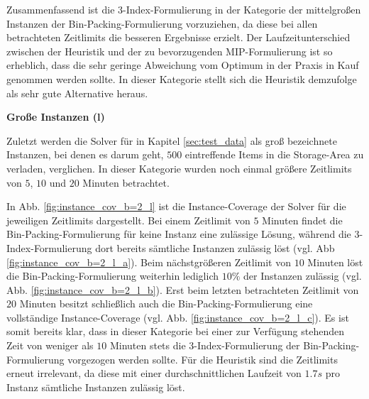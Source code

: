 Zusammenfassend ist die 3-Index-Formulierung in der Kategorie der mittelgroßen Instanzen der Bin-Packing-Formulierung vorzuziehen, da diese bei allen betrachteten Zeitlimits die besseren Ergebnisse erzielt.
Der Laufzeitunterschied zwischen der Heuristik und der zu bevorzugenden MIP-Formulierung ist so erheblich,
dass die sehr geringe Abweichung vom Optimum in der Praxis in Kauf genommen werden sollte.
In dieser Kategorie stellt sich die Heuristik demzufolge als sehr gute Alternative heraus.\newline

\textbf{Große Instanzen (l)}

Zuletzt werden die Solver für in Kapitel \ref{sec:test_data} als groß bezeichnete Instanzen, bei denen es darum geht,
$500$ eintreffende Items in die Storage-Area zu verladen, verglichen. In dieser Kategorie wurden noch einmal größere Zeitlimits von $5$, $10$ und $20$ Minuten betrachtet.

In Abb. \ref{fig:instance_cov_b=2_l} ist die Instance-Coverage der Solver für die jeweiligen Zeitlimits dargestellt.
Bei einem Zeitlimit von $5$ Minuten findet die Bin-Packing-Formulierung für keine Instanz eine zulässige Lösung,
während die 3-Index-Formulierung dort bereits sämtliche Instanzen zulässig löst (vgl. Abb \ref{fig:instance_cov_b=2_l_a}). Beim nächstgrößeren Zeitlimit von $10$ Minuten löst die Bin-Packing-Formulierung weiterhin lediglich $10 \%$ der Instanzen zulässig (vgl. Abb. \ref{fig:instance_cov_b=2_l_b}). Erst beim letzten betrachteten Zeitlimit von $20$ Minuten besitzt schließlich auch die Bin-Packing-Formulierung eine vollständige Instance-Coverage (vgl. Abb. \ref{fig:instance_cov_b=2_l_c}). Es ist somit bereits klar, dass in dieser Kategorie bei einer zur Verfügung stehenden Zeit von weniger als $10$ Minuten stets die 3-Index-Formulierung der Bin-Packing-Formulierung vorgezogen werden sollte. Für die Heuristik sind die Zeitlimits erneut irrelevant, da diese mit einer durchschnittlichen Laufzeit von $1.7s$ pro Instanz sämtliche Instanzen zulässig löst.

